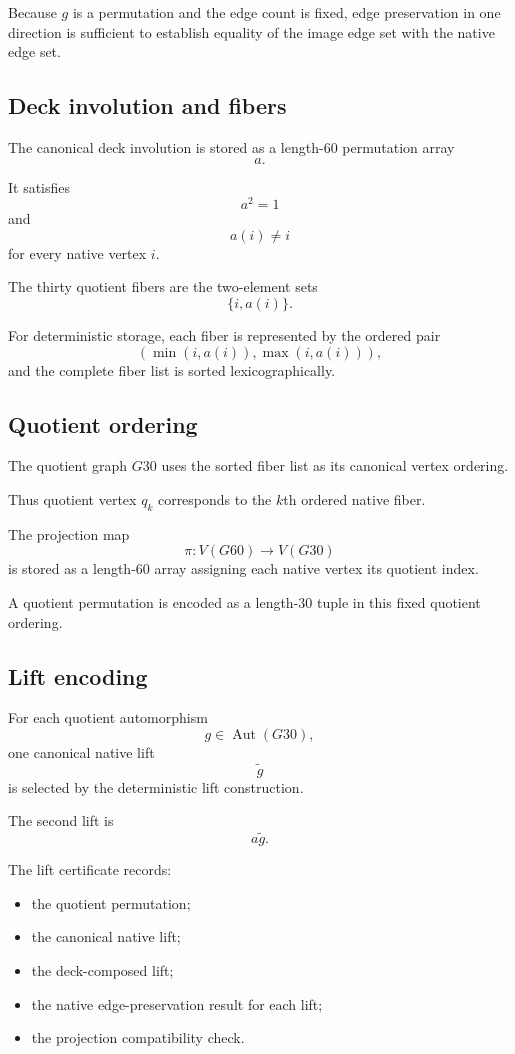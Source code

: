 Because $g$ is a permutation and the edge count is fixed, edge
preservation in one direction is sufficient to establish equality of
the image edge set with the native edge set.

\subsection{Deck involution and fibers}

The canonical deck involution is stored as a length-$60$ permutation
array
\[
a.
\]

It satisfies
\[
a^2=1
\]
and
\[
a(i)\neq i
\]
for every native vertex $i$.

The thirty quotient fibers are the two-element sets
\[
\{i,a(i)\}.
\]

For deterministic storage, each fiber is represented by the ordered pair
\[
(\min(i,a(i)),\max(i,a(i))),
\]
and the complete fiber list is sorted lexicographically.

\subsection{Quotient ordering}

The quotient graph $G30$ uses the sorted fiber list as its canonical
vertex ordering.

Thus quotient vertex $q_k$ corresponds to the $k$th ordered native
fiber.

The projection map
\[
\pi\colon V(G60)\longrightarrow V(G30)
\]
is stored as a length-$60$ array assigning each native vertex its
quotient index.

A quotient permutation is encoded as a length-$30$ tuple in this fixed
quotient ordering.

\subsection{Lift encoding}

For each quotient automorphism
\[
g\in\operatorname{Aut}(G30),
\]
one canonical native lift
\[
\widetilde g
\]
is selected by the deterministic lift construction.

The second lift is
\[
a\widetilde g.
\]

The lift certificate records:

\begin{itemize}
\item the quotient permutation;
\item the canonical native lift;
\item the deck-composed lift;
\item the native edge-preservation result for each lift;
\item the projection compatibility check.
\end{itemize}

